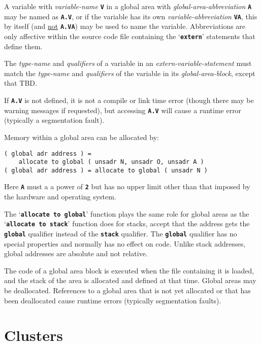 \documentclass[12pt]{article}
\newcommand{\TT}[1]{{\tt \bfseries #1}}
\newenvironment{indpar}[1][0.3in]%
	{\begin{list}{}%
		     {\setlength{\itemsep}{0in}%
		      \setlength{\topsep}{0in}%
		      \setlength{\parsep}{1ex}%
		      \setlength{\labelwidth}{#1}%
		      \setlength{\leftmargin}{#1}%
		      \addtolength{\leftmargin}{\labelsep}}%
	 \item}%
	{\end{list}}
\begin{document}
A variable with {\em variable-name}
\TT{V} in a global area with {\em global-area-abbreviation}
\TT{A} may be named as \TT{A.V}, or if the variable has its own
{\em variable-abbreviation} \TT{VA},
this by itself (and \underline{not} \TT{A.VA})
may be used to name the variable.  Abbreviations are only affective
within the source code file containing the `\TT{extern}' statements
that define them.

The {\em type-name} and {\em qualifiers} of a variable in an
{\em extern-variable-statement} must match the {\em type-name}
and {\em qualifiers} of the variable in its {\em global-area-block},
except that TBD.


If \TT{A.V} is not defined, it is not a compile or link time error
(though there may be warning messages if requested), but accessing
\TT{A.V} will cause a runtime error (typically a segmentation fault).


Memory within a global area can be allocated by:

\begin{indpar}\begin{verbatim}
( global adr address ) =
    allocate to global ( unsadr N, unsadr O, unsadr A )
( global adr address ) = allocate to global ( unsadr N )
\end{verbatim}\end{indpar}\label{ALLOCATE-TO-GLOBAL}

Here \TT{A} must a a power of \TT{2} but has no
upper limit other than that imposed by the hardware and operating system.

The `\TT{allocate to global}' function plays the same role for
global areas as the `\TT{allocate to stack}' function does for
stacks, accept that the address gets the \TT{global} qualifier
instead of the \TT{stack} qualifier.  The \TT{global} qualifier
has no special properties and normally has no effect on code.
Unlike stack addresses, global addresses are absolute and not
relative.

The code of a global area block is executed when the file containing it is
loaded, and the stack of the area is allocated and defined at that
time.  Global areas may be deallocated.  References to a global area
that is not yet allocated or that has been deallocated cause runtime
errors (typically segmentation faults).

\section{Clusters}
\label{CLUSTERS}
\end{document}
